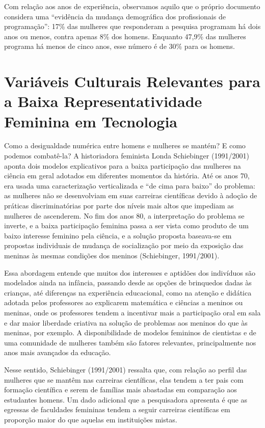 Com relação aos anos de experiência, observamos aquilo que o próprio documento considera uma “evidência da mudança demográfica dos profissionais de programação”: 17\% das mulheres que responderam a pesquisa programam há dois anos ou menos, contra apenas 8\% dos homens. Enquanto 47,9\% das mulheres programa há menos de cinco anos, esse número é de 30\% para os homens. 

\section{Variáveis Culturais Relevantes para a Baixa Representatividade Feminina em Tecnologia}

Como a desigualdade numérica entre homens e mulheres se mantém? E como podemos combatê-la? A historiadora feminista Londa Schiebinger (1991/2001) aponta dois modelos explicativos para a baixa participação das mulheres na ciência em geral adotados em diferentes momentos da história. Até os anos 70, era usada uma caracterização verticalizada e “de cima para baixo” do problema: as mulheres não se desenvolviam em suas carreiras científicas devido à adoção de práticas discriminatórias por parte dos níveis mais altos que impediam as mulheres de ascenderem. No fim dos anos 80, a interpretação do problema se inverte, e a baixa participação feminina passa a ser vista como produto de um baixo interesse feminino pela ciência, e a solução proposta baseava-se em propostas individuais de mudança de socialização por meio da exposição das meninas às mesmas condições dos meninos (Schiebinger, 1991/2001).

Essa abordagem entende que muitos dos interesses e aptidões dos indivíduos são modelados ainda na infância, passando desde as opções de brinquedos dadas às crianças, até diferenças na experiência educacional, como na atenção e didática adotada pelos professores ao explicarem matemática e ciências a meninos ou meninas, onde os professores tendem a incentivar mais a participação oral em sala e dar maior liberdade criativa na solução de problemas aos meninos do que às meninas, por exemplo. A disponibilidade de modelos femininos de cientistas e de uma comunidade de mulheres também são fatores relevantes, principalmente nos anos mais avançados da educação.

Nesse sentido, Schiebinger (1991/2001) ressalta que, com relação ao perfil das mulheres que se mantêm nas carreiras científicas, elas tendem a ter pais com formação científica e serem de famílias mais abastadas em comparação aos estudantes homens. Um dado adicional que a pesquisadora apresenta é que as egressas de faculdades femininas tendem a seguir carreiras científicas em proporção maior do que aquelas em instituições mistas. 

